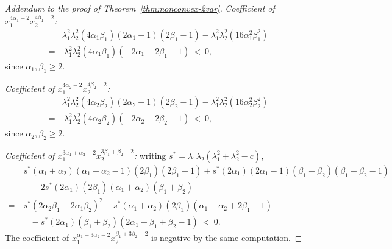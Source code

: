 \documentclass[12pt]{elsarticle}
\theoremstyle{definition}
\begin{document}
\begin{proof}[Addendum to the proof of Theorem~\ref{thm:nonconvex-2var}]
\medskip
\noindent\emph{Coefficient of $x_1^{4\alpha_1 -2}x_2^{4\beta_1 - 2}$:}
\[
\begin{aligned}
  \,&  \lambda_1^2\lambda_2^2 (4\alpha_1\beta_1)(2\alpha_1 - 1)(2\beta_1 - 1) - \lambda_1^2\lambda_2^2 (16\alpha_1^2\beta_1^2)\\
     = &\  \lambda_1^2\lambda_2^2 (4\alpha_1\beta_1) (- 2\alpha_1 -2\beta_1 + 1)\ <\ 0,
\end{aligned}
\]
since $\alpha_1,\beta_1 \ge 2$.

\medskip
\noindent\emph{Coefficient of $x_1^{4\alpha_2 -2}x_2^{4\beta_2 - 2}$:}
\[
\begin{aligned}
  \,&  \lambda_1^2\lambda_2^2 (4\alpha_2\beta_2)(2\alpha_2 - 1)(2\beta_2 - 1) - \lambda_1^2\lambda_2^2 (16\alpha_2^2\beta_2^2)\\
     = &\  \lambda_1^2\lambda_2^2 (4\alpha_2\beta_2) (- 2\alpha_2 -2\beta_2 + 1)\ <\ 0,
\end{aligned}
\]
since $\alpha_2,\beta_2 \ge 2$.

\medskip
\noindent\emph{Coefficient of $x_1^{3\alpha_1 + \alpha_2 -2}x_2^{3\beta_1 + \beta_2  - 2}$:} writing $s^* = \lambda_1\lambda_2(\lambda_1^2 + \lambda_2^2 - c)$,
\[
\begin{aligned}
    &\ s^*(\alpha_1 + \alpha_2)(\alpha_1 + \alpha_2 - 1)(2\beta_1)(2\beta_1 - 1) +
     s^*(2\alpha_1)(2\alpha_1 - 1)(\beta_1 + \beta_2)(\beta_1 + \beta_2 - 1) \\
    &\quad - 2 s^*(2\alpha_1)(2\beta_1)(\alpha_1 + \alpha_2)(\beta_1 + \beta_2)\\
    = &\ s^*(2\alpha_2\beta_1 - 2\alpha_1\beta_2)^2 - s^*(\alpha_1 + \alpha_2)(2\beta_1)(\alpha_1 + \alpha_2 + 2\beta_1 - 1)\\
    &\quad - s^*(2\alpha_1)(\beta_1 + \beta_2)(2\alpha_1 + \beta_1 + \beta_2 - 1)\ <\ 0 .
    \end{aligned}
\]
The coefficient of $x_1^{\alpha_1 + 3\alpha_2 -2}x_2^{\beta_1 + 3\beta_2  - 2}$ is negative by the same computation.


\end{proof}
\end{document}
